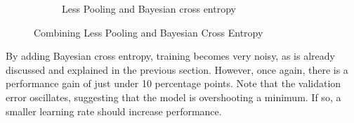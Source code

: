 \documentclass[a4paper,11pt]{article}
\begin{document}
\begin{figure}
\begin{minipage}[b]{\textwidth}
\begin{subfigure}{.5\textwidth}
        \caption{Less Pooling and Bayesian cross entropy}\label{fig:2b}
      \end{subfigure} \par \vspace*{20pt} %
      \caption{Combining Less Pooling and Bayesian Cross Entropy}\label{fig:2}
    \end{minipage}%
    \label{f57}
\end{figure}

By adding Bayesian cross entropy, training becomes very noisy, as is already discussed and explained in the previous section. However, once again, there is a performance gain of just under 10 percentage points. Note that the validation error oscillates, suggesting that the model is overshooting a minimum. If so, a smaller learning rate should increase performance. \\
\end{document}
